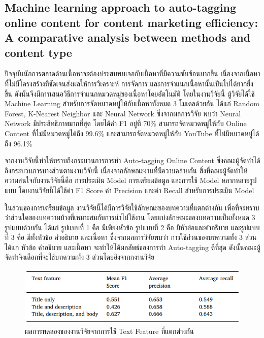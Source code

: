 \documentclass[12pt,oneside,openright,a4paper]{cpe-thai-project}
\begin{document}
  \subsection{Machine learning approach to auto-tagging online content for content marketing efficiency:
    A comparative analysis between methods and content type}
    \hspace{1cm}ปัจจุบันนักการตลาดด้านเนื้อหาจะต้องประสบพบเจอกับเนื้อหาที่มีความซับซ้อนมากขึ้น 
    เนื่องจากเนื้อหาที่ไม่มีโครงสร้างที่ชัดเจนส่งผลให้การวิเคราะห์ การจัดการ และการจำแนกเนื้อหานั้นเป็นไปได้ยากยิ่งขึ้น 
    ดังนั้นจึงมีการเสนอวิธีการจำแนกหมวดหมู่ของเนื้อหาโดยอัตโนมัติ 
    โดยในงานวิจัยนี้ ผู้วิจัยได้ใช้ Machine Learning สำหรับการจัดหมวดหมู่ให้กับเนื้อหาทั้งหมด 3 โมเดลด้วยกัน ได้แก่
    Random Forest, K-Nearest Neighbor และ Neural Network 
    ซึ่งจากผลการวิจัย พบว่า Neural Network มีประสิทธิภาพมากที่สุด โดยได้ค่า F1 อยู่ที่ 70\%  
    สามารถจัดหมวดหมู่ให้กับ Online Content ที่ไม่มีหมวดหมู่ได้ถึง 99.6\% และสามารถจัดหมวดหมู่ให้กับ YouTube ที่ไม่มีหมวดหมู่ได้ถึง 96.1\% \cite{three_model}  

    \hspace{1cm}จากงานวิจัยนี้ทำให้ทราบถึงกระบวนการการทำ Auto-tagging Online Content ซึ่งคณะผู้จัดทำได้อิงกระบวนการบางส่วนตามงานวิจัยนี้
    เนื่องจากลักษณะงานที่มีความคล้ายกัน สิ่งที่คณะผู้จัดทำให้ความสนใจกับงานวิจัยนี้คือ การประเมิน Model การเตรียมข้อมูล และการใช้ Model หลากหลายรูปแบบ
    โดยงานวิจัยนี้ได้ใช้ค่า F1 Score ค่า Precision และค่า Recall สำหรับการประเมิน Model
    
    \hspace{1cm}ในส่วนของการเตรียมข้อมูล งานวิจัยนี้ได้มีการวิจัยใช้ลักษณะของบทความที่แตกต่างกัน เพื่อที่จะทราบว่าส่วนใดของบทความบ้างที่เหมาะสมกับการนำไปใช้งาน 
    โดยแบ่งลักษณะของบทความเป็นทั้งหมด 3 รูปแบบด้วยกัน ได้แก่ รูปแบบที่ 1 คือ มีเพียงหัวข้อ รูปแบบที่ 2 คือ มีหัวข้อและคำอธิบาย และรูปแบบที่ 3 คือ มีทั้งหัวข้อ คำอธิบาย และเนื้อหา
    ซึ่งจากผลการวิจัยพบว่า การใช้ส่วนของบทความทั้ง 3 ส่วน ได้แก่ หัวข้อ คำอธิบาย และเนื้อหา จะทำให้ได้ผลลัพธ์ของการทำ Auto-tagging ดีที่สุด 
    ดังนั้นคณะผู้จัดทำจึงเลือกที่จะใช้บทความทั้ง 3 ส่วนโดยอิงจากกงานวิจัย

    \begin{figure}[!ht]\centering
      \includegraphics[width=13cm]{./img/text_feature.png}
      \caption{ผลการทดลองของงานวิจัยจากการใช้ Text Feature ที่แตกต่างกัน}\label{fig:feature}
    \end{figure}
\end{document}

